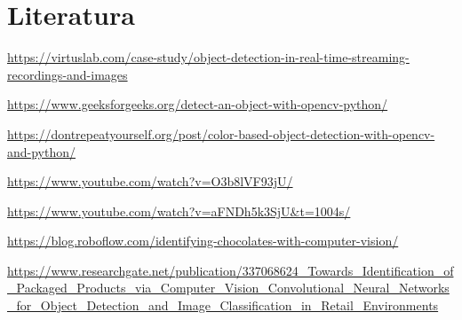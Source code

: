 \documentclass{article}
\begin{document}
\section{Literatura}
\label{Literatura}
\begin{thebibliography}{9}

\url{https://virtuslab.com/case-study/object-detection-in-real-time-streaming-recordings-and-images}

\url{https://www.geeksforgeeks.org/detect-an-object-with-opencv-python/}

\url{https://dontrepeatyourself.org/post/color-based-object-detection-with-opencv-and-python/}

\url{https://www.youtube.com/watch?v=O3b8lVF93jU/}

\url{https://www.youtube.com/watch?v=aFNDh5k3SjU&t=1004s/}

\url{https://blog.roboflow.com/identifying-chocolates-with-computer-vision/}

 \url{https://www.researchgate.net/publication/337068624_Towards_Identification_of_Packaged_Products_via_Computer_Vision_Convolutional_Neural_Networks_for_Object_Detection_and_Image_Classification_in_Retail_Environments}

\end{thebibliography}
\end{document}
